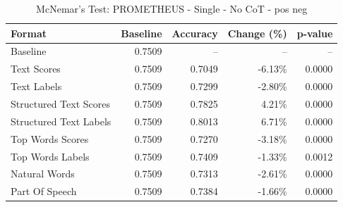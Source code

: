 \begin{table}[htbp]
\centering
\caption{McNemar's Test: PROMETHEUS - Single - No CoT - pos neg}
\label{tab:prometheus-single-no_chain_of_thought-pos_neg}
\begin{tabular}{lrrrr}
\toprule
Format & Baseline & Accuracy & Change (\%) & p-value \\
\midrule
Baseline & 0.7509 & -- & -- & -- \\
Text Scores & 0.7509 & 0.7049 & -6.13\% & 0.0000 \\
Text Labels & 0.7509 & 0.7299 & -2.80\% & 0.0000 \\
Structured Text Scores & 0.7509 & 0.7825 & 4.21\% & 0.0000 \\
Structured Text Labels & 0.7509 & 0.8013 & 6.71\% & 0.0000 \\
Top Words Scores & 0.7509 & 0.7270 & -3.18\% & 0.0000 \\
Top Words Labels & 0.7509 & 0.7409 & -1.33\% & 0.0012 \\
Natural Words & 0.7509 & 0.7313 & -2.61\% & 0.0000 \\
Part Of Speech & 0.7509 & 0.7384 & -1.66\% & 0.0000 \\
\bottomrule
\end{tabular}
\end{table}